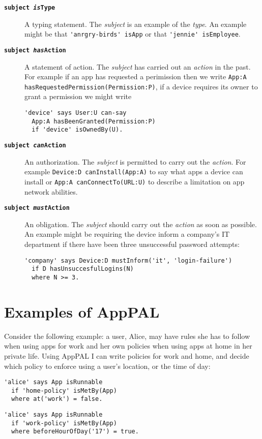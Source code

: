 \documentclass[thesis.tex]{subfiles}
\begin{document}
\begin{description}
\item[\bfseries\texttt{subject \emph{is}Type}]
  A typing statement.  The \emph{subject} is an example of the \emph{type}.  An
  example might be that \lstinline!'anrgry-birds' isApp! or that
  \lstinline!'jennie' isEmployee!.
\item[\bfseries\texttt{subject \emph{has}Action}]
  A statement of action.  The \emph{subject} has carried out an \emph{action} in
  the past. For example if an app has requested a perimission then we write
  \lstinline!App:A hasRequestedPermission(Permission:P)!, if a device requires
  its owner to grant a permission we might write
  \begin{lstlisting}
'device' says User:U can-say 
  App:A hasBeenGranted(Permission:P)
  if 'device' isOwnedBy(U).
  \end{lstlisting}
\item[\bfseries\texttt{subject \emph{can}Action}]
  An authorization. The \emph{subject} is permitted to carry out the \emph{action}.
  For example \lstinline!Device:D canInstall(App:A)! to say what apps a device
  can install or \lstinline!App:A canConnectTo(URL:U)! to describe a limitation
  on app network abilities.
\item[\bfseries\texttt{subject \emph{must}Action}]
  An obligation.  The \emph{subject} should carry out the \emph{action} as soon
  as possible.
  An example might be requiring the device inform a company's IT department if
  there have been three unsuccessful password attempts:
  \begin{lstlisting}
'company' says Device:D mustInform('it', 'login-failure')
  if D hasUnsuccesfulLogins(N)
  where N >= 3.
  \end{lstlisting}
\end{description}


\section{Examples of AppPAL}

Consider the following example: a user, Alice, may have rules she has to follow
when using apps for work and her own policies when using apps at home in her
private life. Using AppPAL I can write policies for work and home, and decide
which policy to enforce using a user's location, or the time of day:

\begin{lstlisting}
'alice' says App isRunnable
  if 'home-policy' isMetBy(App)
  where at('work') = false.
\end{lstlisting}
\begin{lstlisting}
'alice' says App isRunnable
  if 'work-policy' isMetBy(App)
  where beforeHourOfDay('17') = true.
\end{lstlisting}
\end{document}
